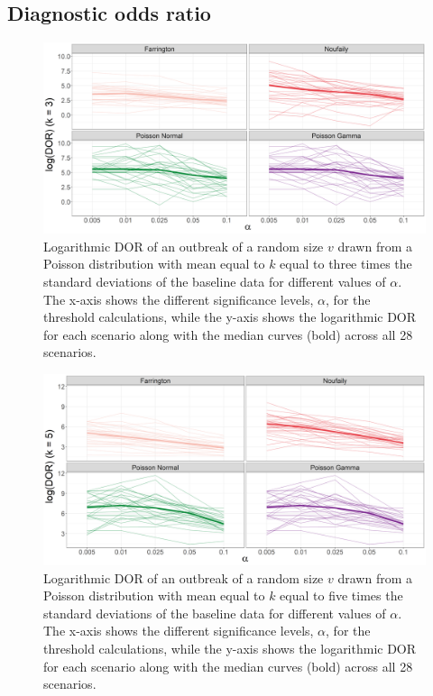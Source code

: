 \documentclass[preprint, 3p, authoryear]{elsarticle} %
\begin{document}
\hypertarget{diagnostic-odds-ratio-1}{%
\subsection{Diagnostic odds ratio}\label{diagnostic-odds-ratio-1}}



\begin{figure}[H]
\includegraphics[width=1\linewidth]{../../figures/logDORk3} \caption{Logarithmic DOR of an outbreak of a random size \(v\) drawn from a Poisson distribution with mean equal to \(k\) equal to three times the standard deviations of the baseline data for different values of \(\alpha\). The x-axis shows the different significance levels, \(\alpha\), for the threshold calculations, while the y-axis shows the logarithmic DOR for each scenario along with the median curves (bold) across all 28 scenarios.}\label{fig:logDORk3}
\end{figure}



\begin{figure}[H]
\includegraphics[width=1\linewidth]{../../figures/logDORk5} \caption{Logarithmic DOR of an outbreak of a random size \(v\) drawn from a Poisson distribution with mean equal to \(k\) equal to five times the standard deviations of the baseline data for different values of \(\alpha\). The x-axis shows the different significance levels, \(\alpha\), for the threshold calculations, while the y-axis shows the logarithmic DOR for each scenario along with the median curves (bold) across all 28 scenarios.}\label{fig:logDORk5}
\end{figure}
\end{document}
